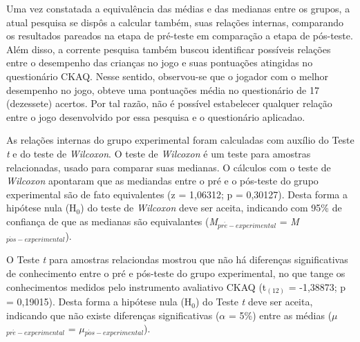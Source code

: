 Uma vez constatada a equivalência das médias e das medianas entre os grupos, a atual pesquisa se dispôs a calcular também, suas relações internas, comparando os resultados pareados na etapa de pré-teste em comparação a etapa de pós-teste. Além disso, a corrente pesquisa também buscou identificar possíveis relações entre o desempenho das crianças no jogo e suas pontuações atingidas no questionário \ac{CKAQ}. Nesse sentido, observou-se que o jogador com o melhor desempenho no jogo, obteve uma pontuações média no questionário de 17 (dezessete) acertos. Por tal razão, não é possível estabelecer qualquer relação entre o jogo desenvolvido por essa pesquisa e o questionário aplicadao. 


As relações internas do grupo experimental foram calculadas com auxílio do Teste \textit{t} e do teste de \textit{Wilcoxon}. O teste de \textit{Wilcoxon} é um teste para amostras relacionadas, usado para comparar suas medianas. O cálculos com o teste de \textit{Wilcoxon} apontaram que as mediandas entre o pré e o pós-teste do grupo experimental são de fato equivalentes (z = 1,06312; p = 0,30127). Desta forma a hipótese nula (H$_0$) do teste de \textit{Wilcoxon} deve ser aceita, indicando com 95\% de confiança de que as medianas são equivalantes (\textit{M}$_{pr\acute{e}-experimental}$ = \textit{M}$_{p\acute{o}s-experimental}$). 

O Teste \textit{t} para amostras relaciondas mostrou que não há diferenças significativas de conhecimento entre o pré e pós-teste do grupo experimental, no que tange os conhecimentos medidos pelo instrumento avaliativo \ac{CKAQ} (t$_{(12)}$ = -1,38873; p = 0,19015). Desta forma a hipótese nula (H$_0$) do Teste \textit{t} deve ser aceita, indicando que não existe diferenças significativas ($\alpha$ = 5\%) entre as médias ($\mu$$_{pr\acute{e}-experimental}$ = $\mu$$_{p\acute{o}s-experimental}$).

